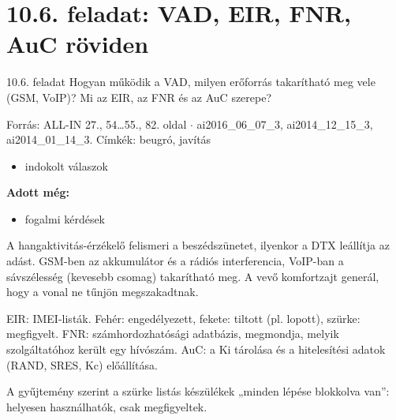 \section{\texorpdfstring{10.6. feladat: VAD, EIR, FNR, AuC röviden}{10.6. feladat: VAD, EIR, FNR, AuC röviden}}\label{ai10_06}
\setcounter{lepes}{0}
\begin{feladat}{10.6. feladat}
Hogyan működik a VAD, milyen erőforrás takarítható meg vele (GSM, VoIP)? Mi az EIR, az FNR és az AuC szerepe?

{\footnotesize\sffamily Forrás: ALL-IN 27., 54\ldots{}55., 82. oldal $\cdot$ ai2016\_06\_07\_3, ai2014\_12\_15\_3, ai2014\_01\_14\_3. Címkék: beugró, javítás}
\end{feladat}
\begin{keresunk}
\begin{itemize}
\item indokolt válaszok
\end{itemize}
\end{keresunk}
\begin{jeloles}
\par\smallskip\textbf{Adott még:}
\begin{itemize}
\item fogalmi kérdések
\end{itemize}
\end{jeloles}

A hangaktivitás-érzékelő felismeri a beszédszünetet, ilyenkor a DTX leállítja az adást. GSM-ben az akkumulátor és a rádiós interferencia, VoIP-ban a sávszélesség (kevesebb csomag) takarítható meg. A vevő komfortzajt generál, hogy a vonal ne tűnjön megszakadtnak.

EIR: IMEI-listák. Fehér: engedélyezett, fekete: tiltott (pl. lopott), szürke: megfigyelt. FNR: számhordozhatósági adatbázis, megmondja, melyik szolgáltatóhoz került egy hívószám. AuC: a Ki tárolása és a hitelesítési adatok (RAND, SRES, Kc) előállítása.
\begin{figyelem}[Javítás]
A gyűjtemény szerint a szürke listás készülékek „minden lépése blokkolva van”: helyesen használhatók, csak megfigyeltek.
\end{figyelem}
\begin{eredmeny}

\begin{center}\end{center}
\end{eredmeny}
